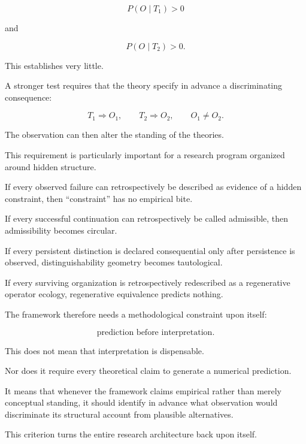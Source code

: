 \documentclass[11pt]{article}
\theoremstyle{remark}
\begin{document}
\begin{equation}
P(O\mid T_1)>0
\end{equation}

and

\begin{equation}
P(O\mid T_2)>0.
\end{equation}

This establishes very little.

A stronger test requires that the theory specify in advance a discriminating consequence:

\begin{equation}
T_1
\Rightarrow
O_1,
\qquad
T_2
\Rightarrow
O_2,
\qquad
O_1\neq O_2.
\end{equation}

The observation can then alter the standing of the theories.

This requirement is particularly important for a research program organized around hidden structure.

If every observed failure can retrospectively be described as evidence of a hidden constraint, then ``constraint'' has no empirical bite.

If every successful continuation can retrospectively be called admissible, then admissibility becomes circular.

If every persistent distinction is declared consequential only after persistence is observed, distinguishability geometry becomes tautological.

If every surviving organization is retrospectively redescribed as a regenerative operator ecology, regenerative equivalence predicts nothing.

The framework therefore needs a methodological constraint upon itself:

\begin{equation}
\boxed{
\text{prediction before interpretation}.
}
\end{equation}

This does not mean that interpretation is dispensable.

Nor does it require every theoretical claim to generate a numerical prediction.

It means that whenever the framework claims empirical rather than merely conceptual standing, it should identify in advance what observation would discriminate its structural account from plausible alternatives.

This criterion turns the entire research architecture back upon itself.
\end{document}
